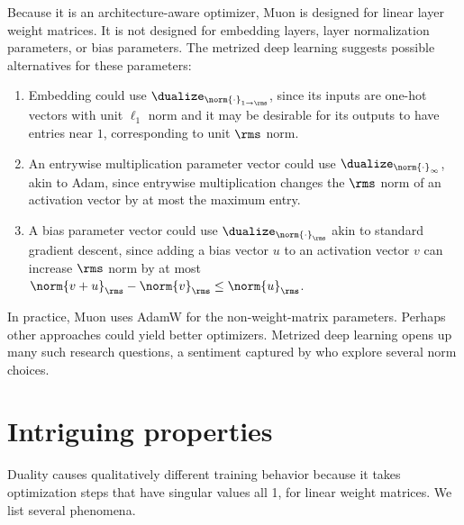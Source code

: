 Because it is an architecture-aware optimizer, Muon is designed for linear layer weight matrices. It is not designed for embedding layers, layer normalization parameters, or bias parameters. The metrized deep learning suggests possible alternatives for these parameters:

\begin{enumerate}
    \item Embedding could use $\dualize_{\norm{\cdot}_{1 \to \rms}}$, since its inputs are one-hot vectors with unit $\ell_1$ norm and it may be desirable for its outputs to have entries near $1$, corresponding to unit $\rms$ norm.
    \item An entrywise multiplication parameter vector could use $\dualize_{\norm{\cdot}_\infty}$, akin to Adam, since entrywise multiplication changes the $\rms$ norm of an activation vector by at most the maximum entry.
    \item A bias parameter vector could use $\dualize_{\norm{\cdot}_\rms}$ akin to standard gradient descent, since adding a bias vector $u$ to an activation vector $v$ can increase $\rms$ norm by at most $\norm{v + u}_\rms - \norm{v}_\rms \leq \norm{u}_\rms$.
\end{enumerate}

In practice, Muon uses AdamW for the non-weight-matrix parameters. Perhaps other approaches could yield better optimizers. Metrized deep learning opens up many such research questions, a sentiment captured by \citet{pethick2025trainingdeeplearningmodels} who explore several norm choices.


\section{Intriguing properties}
\label{subsec:intriguing-properties}

Duality causes qualitatively different training behavior because it takes optimization steps that have singular values all 1, for linear weight matrices. We list several phenomena.

